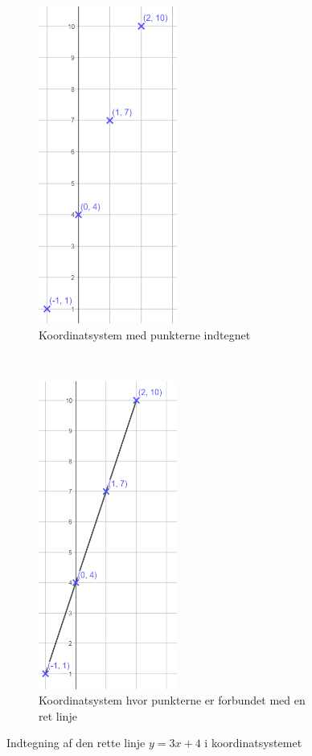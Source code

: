 \begin{figure}[ht]
    \centering
    \begin{subfigure}[t]{0.5\textwidth}
        \centering
        \includegraphics[width=0.5\textwidth, height=0.8\textwidth]{img_5}
        \caption{Koordinatsystem med punkterne indtegnet}
    \end{subfigure}%
    ~ 
    \begin{subfigure}[t]{0.5\textwidth}
        \centering
        \includegraphics[width=0.5\textwidth, height=0.8\textwidth]{img_6}
        \caption{Koordinatsystem hvor punkterne er forbundet med en ret linje}
    \end{subfigure}
    \caption{Indtegning af den rette linje $y =3x + 4 $ i koordinatsystemet}
\end{figure}

